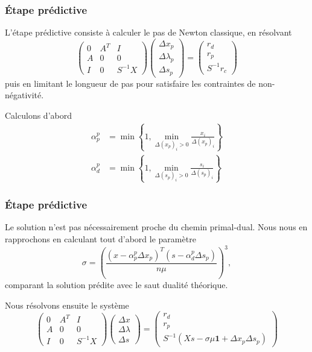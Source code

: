 \documentclass[usepdftitle=false, aspectratio=169]{beamer}
\def\bone{\boldsymbol{1}}
\begin{document}
\begin{frame}
\frametitle{Étape prédictive}

L'étape prédictive consiste à calculer le pas de Newton classique, en résolvant
$$\begin{pmatrix}
	0 & A^T & I  \\
	A & 0 & 0\\
	I & 0 & S^{-1}X
\end{pmatrix}\begin{pmatrix}
	\Delta x_p  \\
	\Delta \lambda_p \\
	\Delta s_p
\end{pmatrix} = \begin{pmatrix}
	r_d  \\
	r_p  \\
	S^{-1}r_c 
\end{pmatrix}$$
puis en limitant le longueur de pas pour satisfaire les contraintes de non-négativité.

\mbox{}

Calculons d'abord
\begin{align*}
\alpha_p^p &= \min \left\{1, \min_{\Delta (x_p)_i > 0} \frac{x_i}{\Delta (x_p)_i } \right\} \\
\alpha_d^p &= \min \left\{1, \min_{\Delta (s_p)_i > 0} \frac{s_i}{\Delta (s_p)_i } \right\}
\end{align*}

\end{frame}

\begin{frame}
\frametitle{Étape prédictive}

Le solution n'est pas nécessairement proche du chemin primal-dual.
Nous nous en rapprochons en calculant tout d'abord le paramètre
$$
\sigma = \left(\frac{(x - \alpha_p^p\Delta x_p)^T(s - \alpha_d^p\Delta s_p)}{n\mu}\right)^3,
$$
comparant la solution prédite avec le saut dualité théorique.

\mbox{}

Nous résolvons ensuite le système
$$\begin{pmatrix}
	0 & A^T & I  \\
	A & 0 & 0\\
	I & 0 & S^{-1}X
\end{pmatrix}\begin{pmatrix}
	\Delta x  \\
	\Delta \lambda \\
	\Delta s
\end{pmatrix} = \begin{pmatrix}
	r_d  \\
	r_p  \\
	S^{-1}(Xs - \sigma \mu \bone + \Delta x_p \Delta s_p) 
\end{pmatrix}$$

\end{frame}
\end{document}
